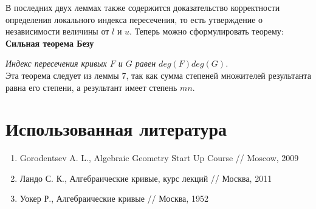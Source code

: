 \documentclass[a4paper, 12pt]{article}
\begin{document}
В последних двух леммах также содержится доказательство корректности определения локального индекса пересечения, то есть утверждение о независимости величины от $l$ и $u$. Теперь можно сформулировать теорему:\\

\textbf{Сильная теорема Безу}

\textit{Индекс пересечения кривых $F$ и $G$ равен $deg(F)deg(G)$.}\\

Эта теорема следует из леммы 7, так как сумма степеней множителей результанта равна его степени, а результант имеет степень $mn$.

\begin{comment}
  1. Разложение результанта на билинейные множители. См. семинарский листок из соответствующей алгебры.
  2. Определение локальной кратности пересечения. ()
  3. Совпадение кратности пересечения вообще.
  4. Теорема о совпадении с кратностями множителей результанта.
  5. Оттуда немедленно сильная форма теоремы.
  6. И некоторым довольно длинным образом, полностью описанным у Уокера, соотношения Плюккера.
  _Только эти способом относительно легко перейти к соотношениям Плюккера, вероятно._

  Или

  1. Ввести инвариант непрерывных деформаций кривых - число пересечений с учётом кратностей. Та же ловкость рук.
  2. Кратность определить как число точек пересечения в случае, когда обе прямые вырождены. (соответственно нужно подробно описать класс деформаций.)
  3. Теорема Безу получается автоматически после того, как для каждой конкретной точки посчитается эта кратность. Странно и непонятно.

  Или

  1. Как у Ландо. Но чтобы удержать уровень строгости, нужно ввести много нового аппарата.

  Или

  1. Спрямить одну из кривых.
  2. Определить "число пересечений с учётом кратностей" так, чтобы оно было инвариантом диффеоморфизма. Проблема в особых точках.
  3. Рассмотреть случай на прямой. При этом вторая кривая получает степень mn через преобразование координат.

  Или

  1. Раздутие результанта в диагонали.

  Или

  1. Раздутие нашей плоскости в точках пересечения кривых. Кратность определяется по числу точек, в которые перешла данная. Это согласуется с произведением числа касательных, но намного строже.
  2. Записать раздутие уравнениями.
  3. Посчитать число всех точек на воткнутых прямых. Инвариантным способом на уравнениях.
\end{comment}

\pagebreak
\section{Использованная литература}
\begin{enumerate}
  \item Gorodentsev A. L., Algebraic Geometry Start Up Course // Moscow, 2009
  \item Ландо С. К., Алгебраические кривые, курс лекций // Москва, 2011
  \item Уокер Р., Алгебраические кривые // Москва, 1952
\end{enumerate}
\end{document}
